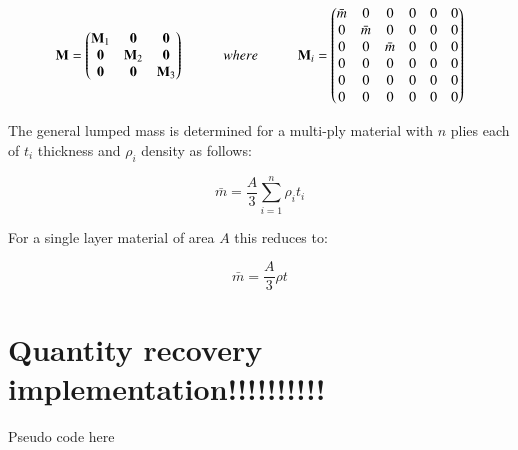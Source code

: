 \begin{equation} 
\mathbf{M} =  
\begin{pmatrix}
\mathbf{M}_1 & \mathbf{0} & \mathbf{0}\\
\mathbf{0} & \mathbf{M}_2 & \mathbf{0}\\
\mathbf{0} & \mathbf{0} & \mathbf{M}_3
\end{pmatrix}
\hspace{10mm}
where
\hspace{10mm}
\mathbf{M}_i =  
\begin{pmatrix}
\bar{m} & 0 & 0 & 0 & 0 & 0\\
0 & \bar{m} & 0 & 0 & 0 & 0\\
0 & 0 & \bar{m} &0 & 0 & 0\\
0 & 0 & 0 & 0 & 0 & 0\\
0 & 0 & 0 & 0 & 0 & 0\\
0 & 0 & 0 & 0 & 0 & 0
\end{pmatrix}
\label{eqt15}
\end{equation}

The general lumped mass is determined for a multi-ply material with $n$ plies each of $t_i$ thickness and $\rho_i$ density as follows:

\begin{equation} 
\bar{m} = \frac{A}{3} \sum_{i=1}^n \rho_i t_i
\label{eqt16}
\end{equation}

For a single layer material of area $A$ this reduces to:

\begin{equation} 
\bar{m} = \frac{A}{3} \rho t
\label{eqt17}
\end{equation}

\section{Quantity recovery implementation!!!!!!!!!!}

Pseudo code here

